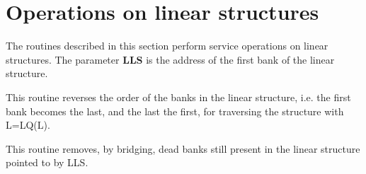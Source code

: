 \section{Operations on linear structures}
\par The routines described in this section perform service operations
on linear structures.
The parameter {\bf LLS} is the address of the first bank
of the linear structure.
\par This routine reverses the order of the banks in the linear structure,
i.e. the first bank becomes the last, and the last the first,
for traversing the structure with L=LQ(L).
\par This routine removes, by bridging, dead banks still present
in the linear structure pointed to by LLS.
